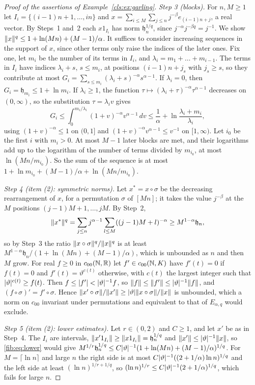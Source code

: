 \begin{proof}[Proof of the assertions of Example~\ref{cls:ex:garling}]
\emph{Step 3 (blocks).} For $n,M\ge1$ let $I_i=\{(i-1)n+1,\dots,in\}$ and
$x=\sum_{i\le M}\sum_{j\le n}j^{-\beta}e_{(i-1)n+j}$, a real vector. By Steps~1 and~2 each $x1_{I_i}$ has norm $\mathfrak
h_n^{1/q}$, since $j^{-\alpha}j^{-\beta q}=j^{-1}$. We show $\lVert x\rVert^q\le1+\ln(Mn)+(M-1)/\alpha$. It suffices to consider
increasing sequences in the support of $x$, since other terms only raise the indices of the later ones. Fix one, let
$m_i$ be the number of its terms in $I_i$, and $\lambda_i=m_1+\dots+m_{i-1}$. The terms in $I_i$ have indices
$\lambda_i+s$, $s\le m_i$, at positions $(i-1)n+j_s$ with $j_s\ge s$, so they contribute at most
$G_i=\sum_{s\le m_i}(\lambda_i+s)^{-\alpha}s^{\alpha-1}$. If $\lambda_i=0$, then $G_i=\mathfrak h_{m_i}\le1+\ln m_i$. If
$\lambda_i\ge1$, the function $\tau\mapsto(\lambda_i+\tau)^{-\alpha}\tau^{\alpha-1}$ decreases on $(0,\infty)$, so the
substitution $\tau=\lambda_iv$ gives
\[
 G_i\le\int_0^{m_i/\lambda_i}(1+v)^{-\alpha}v^{\alpha-1}\,dv\le\frac1\alpha+\ln\frac{\lambda_i+m_i}{\lambda_i},
\]
using $(1+v)^{-\alpha}\le1$ on $(0,1]$ and $(1+v)^{-\alpha}v^{\alpha-1}\le v^{-1}$ on $[1,\infty)$. Let $i_0$ be the first
$i$ with $m_i>0$. At most $M-1$ later blocks are met, and their logarithms add up to the logarithm of the number of
terms divided by $m_{i_0}$, at most $\ln(Mn/m_{i_0})$. So the sum of the sequence is at most
$1+\ln m_{i_0}+(M-1)/\alpha+\ln(Mn/m_{i_0})$.

\emph{Step 4 (item (2): symmetric norms).} Let $x^*=x\circ\sigma$ be the decreasing rearrangement of $x$, for a
permutation $\sigma$ of $[Mn]$; it takes the value $j^{-\beta}$ at the $M$ positions $(j-1)M+1,\dots,jM$. By Step~2,
\[
 \lVert x^*\rVert^q=\sum_{j\le n}j^{\alpha-1}\sum_{l\le M}((j-1)M+l)^{-\alpha}\ge M^{1-\alpha}\mathfrak h_n,
\]
so by Step~3 the ratio $\lVert x\circ\sigma\rVert^q/\lVert x\rVert^q$ is at least $M^{1-\alpha}\mathfrak h_n/(1+\ln(Mn)+(M-1)/\alpha)$,
which is unbounded as $n$ and then $M$ grow. For real $f\ge0$ in $c_{00}(\mathbb N,\mathbb R)$ let $f'\in c_{00}(\mathbb N,K)$ have
$f'(t)=0$ if $f(t)=0$ and $f'(t)=\vartheta^{c(t)}$ otherwise, with $c(t)$ the largest integer such that
$\lvert \vartheta\rvert^{c(t)}\ge f(t)$. Then $f\le\lvert f'\rvert<\lvert \vartheta\rvert^{-1}f$, so $\lVert f\rVert\le\lVert f'\rVert\le\lvert \vartheta\rvert^{-1}\lVert f\rVert$,
and $(f\circ\sigma)'=f'\circ\sigma$. Hence $\lVert x'\circ\sigma\rVert/\lVert x'\rVert\ge\lvert \vartheta\rvert\lVert x\circ\sigma\rVert/\lVert x\rVert$ is
unbounded, which a norm on $c_{00}$ invariant under permutations and equivalent to that of $E_{\alpha,q}$ would exclude.

\emph{Step 5 (item (2): lower estimates).} Let $r\in(0,2)$ and $C\ge1$, and let $x'$ be as in Step~4. The $I_i$ are
intervals, $\lVert x'1_{I_i}\rVert\ge\lVert x1_{I_i}\rVert=\mathfrak h_n^{1/q}$ and $\lVert x'\rVert\le\lvert \vartheta\rvert^{-1}\lVert x\rVert$, so
\eqref{fib:eq:lower} would give $M^{1/r}\mathfrak h_n^{1/q}\le C\lvert \vartheta\rvert^{-1}(1+\ln(Mn)+(M-1)/\alpha)^{1/q}$. For
$M=\lceil\ln n\rceil$ and large $n$ the right side is at most $C\lvert \vartheta\rvert^{-1}((2+1/\alpha)\ln n)^{1/q}$ and the left
side at least $(\ln n)^{1/r+1/q}$, so $(\ln n)^{1/r}\le C\lvert \vartheta\rvert^{-1}(2+1/\alpha)^{1/q}$, which fails for large $n$.


\end{proof}
